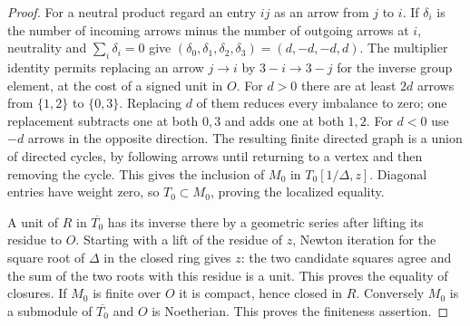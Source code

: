 \documentclass[a4paper,11pt]{article}
\theoremstyle{definition}
\theoremstyle{remark}
\numberwithin{equation}{section}
\begin{document}
\begin{proof}
For a neutral product regard an entry \(ij\) as an arrow
from \(j\) to \(i\). If \(\delta_i\) is the number of incoming
arrows minus the number of outgoing arrows at \(i\), neutrality
and \(\sum_i\delta_i=0\) give
\((\delta_0,\delta_1,\delta_2,\delta_3)=(d,-d,-d,d)\).
The multiplier identity permits replacing an arrow \(j\to i\)
by \(3-i\to3-j\) for the inverse group element, at the cost
of a signed unit in \(O\). For \(d>0\) there are at least
\(2d\) arrows from \(\{1,2\}\) to \(\{0,3\}\). Replacing \(d\)
of them reduces every imbalance to zero; one replacement
subtracts one at both \(0,3\) and adds one at both \(1,2\).
For \(d<0\) use \(-d\) arrows in the opposite direction.
The resulting finite directed graph is a union of directed
cycles, by following arrows until returning to a vertex and
then removing the cycle. This gives the inclusion of \(M_0\)
in \(T_0[1/\Delta,z]\). Diagonal entries have weight zero, so
\(T_0\subset M_0\), proving the localized equality.

A unit of \(R\) in \(\overline{T_0}\) has its inverse there
by a geometric series after lifting its residue to \(O\).
Starting with a lift of the residue of \(z\), Newton iteration
for the square root of \(\Delta\) in the closed ring gives \(z\):
the two candidate squares agree and the sum of the two roots
with this residue is a unit. This proves the equality of closures.
If \(M_0\) is finite over \(O\) it is compact, hence closed in
\(R\). Conversely \(M_0\) is a submodule of \(\overline{T_0}\)
and \(O\) is Noetherian. This proves the finiteness assertion.
\end{proof}
\end{document}
